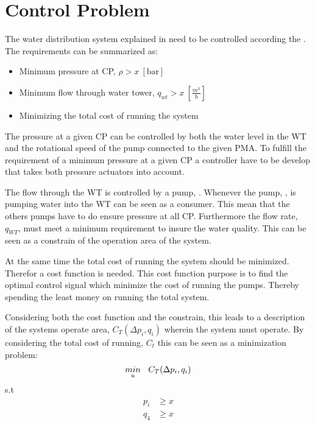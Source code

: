 \section{Control Problem}
\label{control_problem}

The water distribution system explained in  need to be controlled according the . The requirements can be summarized as: 

\begin{itemize}
	\item Minimum pressure at CP, $\rho > x \:[\text{bar}]$
	\item Minimum flow through water tower, $q_{wt} > x \:[\frac{m^3}{h}]$
	\item Minimizing the total cost of running the system
\end{itemize}

The pressure at a given CP can be controlled by both the water level in the WT and the rotational speed of the pump connected to the given PMA. To fulfill the requirement of a minimum pressure at a given CP a controller have to be develop that takes both pressure actuators into account. 

The flow through the WT is controlled by a pump, . Whenever the pump, , is pumping water into the WT can be seen as a consumer. This mean that the others pumps have to do ensure pressure at all CP. Furthermore the flow rate, $q_{WT}$, must meet a minimum requirement to insure the water quality. This can be seen as a constrain of the operation area of the system. 

At the same time the total cost of running the system should be minimized. Therefor a cost function is needed. This cost function purpose is to find the optimal control signal which minimize the cost of running the pumps. Thereby spending the least money on running the total system. 

Considering both the cost function and the constrain, this leads to a description of the systems operate area, $C_T(\Delta{p}_i,q_i)$ wherein the system must operate. By considering the total cost of running, $C_t$ this can be seen as a minimization problem:
\begin{equation}
\underset{u}{min} \: \: \: \: C_T(\Delta{p}_i,q_i) \\
\end{equation}
\vspace*{-0.4mm}
s.t 
\vspace*{-0.4mm}
\begin{align*}
p_i &\geq x \\
q_4 &\geq x 
\end{align*}

